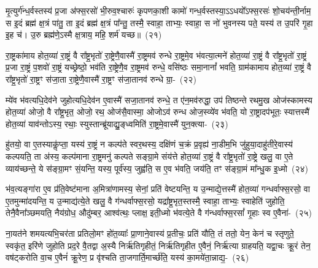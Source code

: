 मृ॒त्युर्ग॑न्ध॒र्वस्तस्य॑ प्र॒जा अ॑फ्स॒रसो॑ भी॒रुव॒श्चारुः॑ कृपणका॒शी कामो॑ गन्ध॒र्वस्तस्या॒\-ऽऽ\-\-धयो᳚\-ऽफ्स॒रसः॑ शो॒चय॑न्ती॒र्नाम॒ स इ॒दं ब्रह्म॑ क्ष॒त्रं पा॑तु॒ ता इ॒दं ब्रह्म॑ क्ष॒त्रं पा᳚न्तु॒ तस्मै॒ स्वाहा॒ ताभ्यः॒ स्वाहा॒ स नो॑ भुवनस्य पते॒ यस्य॑ त उ॒परि॑ गृ॒हा इ॒ह च॑। उ॒रु ब्रह्म॑णे॒\-ऽस्मै क्ष॒त्राय॒ महि॒ शर्म॑ यच्छ॥~(२१)

{\anuvakamend[{मनो॑\-ऽमृड॒यः षट्च॑त्वारिꣳशच्च}]}%

रा॒ष्ट्रका॑माय होत॒व्या॑ रा॒ष्ट्रं वै रा᳚ष्ट्र॒भृतो॑ रा॒ष्ट्रेणै॒वास्मै॑ रा॒ष्ट्रमव॑ रुन्धे रा॒ष्ट्रमे॒व भ॑वत्या॒त्मने॑ होत॒व्या॑ रा॒ष्ट्रं वै रा᳚ष्ट्र॒भृतो॑ रा॒ष्ट्रं प्र॒जा रा॒ष्ट्रं प॒शवो॑ रा॒ष्ट्रं यच्छ्रेष्ठो॒ भव॑ति रा॒ष्ट्रेणै॒व रा॒ष्ट्रमव॑ रुन्धे॒ वसि॑ष्ठः समा॒नानां᳚ भवति॒ ग्राम॑कामाय होत॒व्या॑ रा॒ष्ट्रं वै रा᳚ष्ट्र॒भृतो॑ रा॒ष्ट्रꣳ स॑जा॒ता रा॒ष्ट्रेणै॒वास्मै॑ रा॒ष्ट्रꣳ स॑जा॒तानव॑ रुन्धे ग्रा॒-~(२२)

म्ये॑व भ॑वत्यधि॒देव॑ने जुहोत्यधि॒देव॑न ए॒वास्मै॑ सजा॒तानव॑ रुन्धे॒ त ए॑न॒मव॑रुद्धा॒ उप॑ तिष्ठन्ते रथमु॒ख ओज॑स्कामस्य होत॒व्या॑ ओजो॒ वै रा᳚ष्ट्र॒भृत॒ ओजो॒ रथ॒ ओज॑सै॒वास्मा॒ ओजो\-ऽव॑ रुन्ध ओज॒स्व्ये॑व भ॑वति॒ यो रा॒ष्ट्रादप॑भूतः॒ स्यात्तस्मै॑ होत॒व्या॑ याव॑न्तो\-ऽस्य॒ रथाः॒ स्युस्तान्ब्रू॑याद्यु॒ङ्‌ध्वमिति॑ रा॒ष्ट्रमे॒वास्मै॑ युन॒क्त्या-~(२३)

हु॑तयो॒ वा ए॒तस्याकॢ॑प्ता॒ यस्य॑ रा॒ष्ट्रं न कल्प॑ते स्वर॒थस्य॒ दक्षि॑णं च॒क्रं प्र॒वृह्य॑ ना॒डीम॒भि जु॑हुया॒दाहु॑तीरे॒वास्य॑ कल्पयति॒ ता अ॑स्य॒ कल्प॑माना रा॒ष्ट्रमनु॑ कल्पते सङ्ग्रा॒मे संय॑त्ते होत॒व्या॑ रा॒ष्ट्रं वै रा᳚ष्ट्र॒भृतो॑ रा॒ष्ट्रे खलु॒ वा ए॒ते व्याय॑च्छन्ते॒ ये स॑ङ्ग्रा॒मꣳ सं॒यन्ति॒ यस्य॒ पूर्व॑स्य॒ जुह्व॑ति॒ स ए॒व भ॑वति॒ जय॑ति॒ तꣳ स॑ङ्ग्रा॒मं मा᳚न्धु॒क इ॒ध्मो~(२४)

भ॑व॒त्यङ्गा॑रा ए॒व प्र॑ति॒वेष्ट॑माना अ॒मित्रा॑णामस्य॒ सेनां॒ प्रति॑ वेष्टयन्ति॒ य उ॒न्माद्ये॒त्तस्मै॑ होत॒व्या॑ गन्धर्वाफ्स॒रसो॒ वा ए॒तमुन्मा॑दयन्ति॒ य उ॒न्माद्य॑त्ये॒ते खलु॒ वै ग॑न्धर्वाफ्स॒रसो॒ यद्रा᳚ष्ट्र॒भृत॒स्तस्मै॒ स्वाहा॒ ताभ्यः॒ स्वाहेति॑ जुहोति॒ तेनै॒वैना᳚ञ्छमयति॒ नैय॑ग्रोध॒ औदु॑म्बर॒ आश्व॑त्थः॒ प्लाक्ष॒ इती॒ध्मो भ॑वत्ये॒ते वै ग॑न्धर्वाफ्स॒रसां᳚ गृ॒हाः स्व ए॒वैना॑-~(२५)

ना॒यत॑ने शमयत्यभि॒चर॑ता प्रतिलो॒मꣳ हो॑त॒व्याः᳚ प्रा॒णाने॒वास्य॑ प्र॒तीचः॒ प्रति॑ यौति॒ तं ततो॒ येन॒ केन॑ च स्तृणुते॒ स्वकृ॑त॒ इरि॑णे जुहोति प्रद॒रे वै॒तद्वा अ॒स्यै निर्\mbox{}ऋ॑तिगृहीतं॒ निर्\mbox{}ऋ॑तिगृहीत ए॒वैनं॒ निर्\mbox{}ऋ॑त्या ग्राहयति॒ यद्वा॒चः क्रू॒रं तेन॒ वष॑ट्करोति वा॒च ए॒वैनं॑ क्रू॒रेण॒ प्र वृ॑श्चति ता॒जगार्ति॒मार्च्छ॑ति॒ यस्य॑ का॒मये॑ता॒न्नाद्य॒-~(२६)

